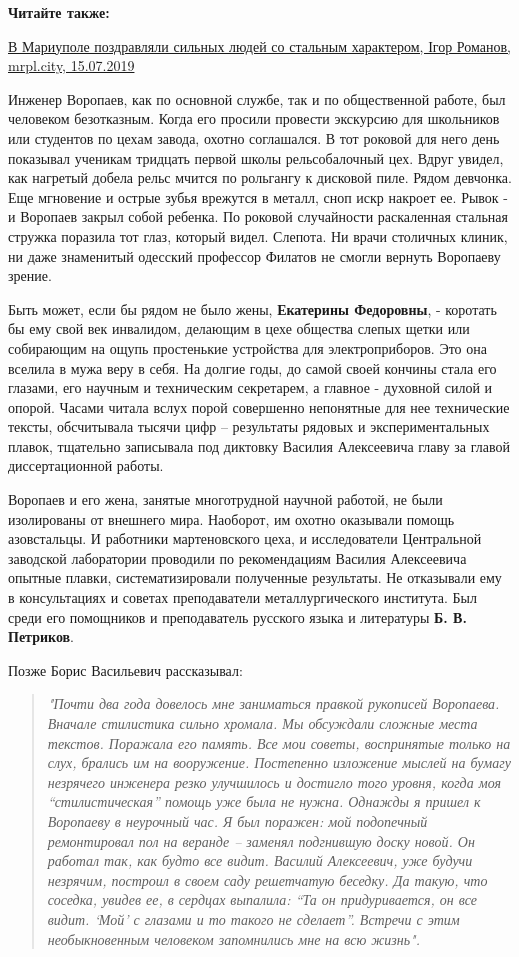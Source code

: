 \textbf{Читайте также:} 

\href{https://mrpl.city/news/view/v-mariupole-pozdravlyali-silnyh-lyudej-so-stalnym-harakterom-foto}{%
В Мариуполе поздравляли сильных людей со стальным характером, Ігор Романов, mrpl.city, 15.07.2019}

Инженер Воропаев, как по основной службе, так и по общественной работе, был
человеком безотказным. Когда его просили провести экскурсию для школьников или
студентов по цехам завода, охотно соглашался. В тот роковой для него день
показывал ученикам тридцать первой школы рельсобалочный цех. Вдруг увидел, как
нагретый добела рельс мчится по рольгангу к дисковой пиле. Рядом девчонка. Еще
мгновение и острые зубья врежутся в металл, сноп искр накроет ее. Рывок - и
Воропаев закрыл собой ребенка. По роковой случайности раскаленная стальная
стружка поразила тот глаз, который видел. Слепота. Ни врачи столичных клиник,
ни даже знаменитый одесский профессор Филатов не смогли вернуть Воропаеву
зрение.

Быть может, если бы рядом не было жены, \textbf{Екатерины Федоровны}, - коротать бы ему
свой век инвалидом, делающим в цехе общества слепых щетки или собирающим на
ощупь простенькие устройства для электроприборов. Это она вселила в мужа веру в
себя. На долгие годы, до самой своей кончины стала его глазами, его научным и
техническим секретарем, а главное - духовной силой и опорой. Часами читала
вслух порой совершенно непонятные для нее технические тексты, обсчитывала
тысячи цифр – результаты рядовых и экспериментальных плавок, тщательно
записывала под диктовку Василия Алексеевича главу за главой диссертационной
работы.

Воропаев и его жена, занятые многотрудной научной работой, не были изолированы
от внешнего мира. Наоборот, им охотно оказывали помощь азовстальцы. И работники
мартеновского цеха, и исследователи Центральной заводской лаборатории проводили
по рекомендациям Василия Алексеевича опытные плавки, систематизировали
полученные результаты. Не отказывали ему в консультациях и советах
преподаватели металлургического института. Был среди его помощников и
преподаватель русского языка и литературы \textbf{Б. В. Петриков}.

Позже Борис Васильевич рассказывал:

\begin{quote}
\em
"Почти два года довелось мне заниматься
правкой рукописей Воропаева. Вначале стилистика сильно хромала. Мы обсуждали
сложные места текстов. Поражала его память. Все мои советы, воспринятые только
на слух, брались им на вооружение. Постепенно изложение мыслей на бумагу
незрячего инженера резко улучшилось и достигло того уровня, когда моя
\enquote{стилистическая} помощь уже была не нужна. Однажды я пришел к Воропаеву в
неурочный час. Я был поражен: мой подопечный ремонтировал пол на веранде –
заменял подгнившую доску новой. Он работал так, как будто все видит. Василий
Алексеевич, уже будучи незрячим, построил в своем саду решетчатую беседку. Да
такую, что соседка, увидев ее, в сердцах выпалила: \enquote{Та он
придуривается, он все видит. \enquote{Мой} с глазами и то такого не сделает}. 
Встречи с этим необыкновенным
человеком запомнились мне на всю жизнь".
\end{quote}

